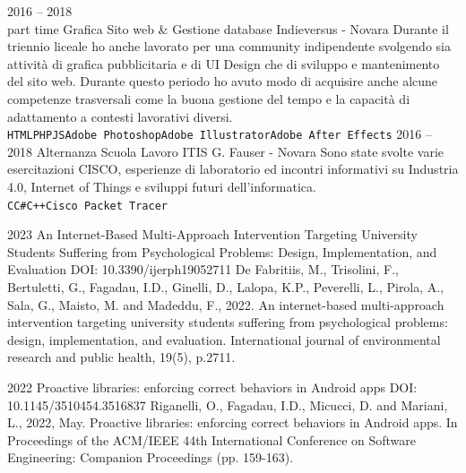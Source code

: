 \documentclass[9pt]{developercv} %
\begin{document}
\begin{entrylist}
	\entry
		{2016 -- 2018\\\footnotesize{part time}}
		{Grafica Sito web \& Gestione database}
		{Indieversus - Novara}
		{Durante il triennio liceale ho anche lavorato per una community indipendente svolgendo sia attività di grafica pubblicitaria e di UI Design che di sviluppo e mantenimento del sito web. Durante questo periodo ho avuto modo di acquisire anche alcune competenze trasversali come la buona gestione del tempo e la capacità di adattamento a contesti lavorativi diversi. \\ \texttt{HTML}\slashsep\texttt{PHP}\slashsep\texttt{JS}\slashsep\texttt{Adobe Photoshop}\slashsep\texttt{Adobe Illustrator}\slashsep\texttt{Adobe After Effects}}
	\entry
		{2016 -- 2018}
		{Alternanza Scuola Lavoro}
		{ITIS G. Fauser - Novara}
		{Sono state svolte varie esercitazioni CISCO, esperienze di laboratorio ed incontri informativi su Industria 4.0, Internet of Things e sviluppi futuri dell'informatica. \\ \texttt{C}\slashsep\texttt{C\#}\slashsep\texttt{C++}\slashsep\texttt{Cisco Packet Tracer}}
\end{entrylist}


\begin{entrylist}
\entry
	{2023}
	{An Internet-Based Multi-Approach Intervention Targeting University Students Suffering from Psychological Problems: Design, Implementation, and Evaluation}
	{DOI: 10.3390/ijerph19052711}
	{De Fabritiis, M., Trisolini, F., Bertuletti, G., Fagadau, I.D., Ginelli, D., Lalopa, K.P., Peverelli, L., Pirola, A., Sala, G., Maisto, M. and Madeddu, F., 2022. An internet-based multi-approach intervention targeting university students suffering from psychological problems: design, implementation, and evaluation. International journal of environmental research and public health, 19(5), p.2711.}

\entry
	{2022}
	{Proactive libraries: enforcing correct behaviors in Android apps}
	{DOI: 10.1145/3510454.3516837}
	{Riganelli, O., Fagadau, I.D., Micucci, D. and Mariani, L., 2022, May. Proactive libraries: enforcing correct behaviors in Android apps. In Proceedings of the ACM/IEEE 44th International Conference on Software Engineering: Companion Proceedings (pp. 159-163).}
\end{entrylist}
	
\end{document}
